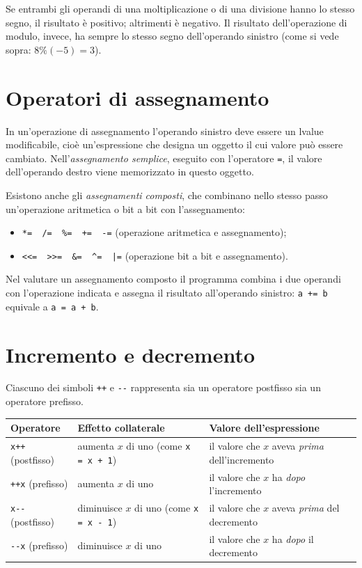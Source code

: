 \documentclass[11pt,a4paper]{article}
\begin{document}
\begin{osservazione}
Se entrambi gli operandi di una moltiplicazione o di una divisione hanno lo stesso segno, il risultato è positivo; altrimenti è negativo. Il risultato dell'operazione di modulo, invece, ha sempre lo stesso segno dell'operando sinistro (come si vede sopra: $8 \% (-5) = 3$).
\end{osservazione}

\section{Operatori di assegnamento}

In un'operazione di assegnamento l'operando sinistro deve essere un lvalue modificabile, cioè un'espressione che designa un oggetto il cui valore può essere cambiato. Nell'\emph{assegnamento semplice}, eseguito con l'operatore \lstinline|=|, il valore dell'operando destro viene memorizzato in questo oggetto.

Esistono anche gli \emph{assegnamenti composti}, che combinano nello stesso passo un'operazione aritmetica o bit a bit con l'assegnamento:
\begin{itemize}
    \item \lstinline|*=  /=  %=  +=  -=| (operazione aritmetica e assegnamento);
    \item \lstinline!<<=  >>=  &=  ^=  |=! (operazione bit a bit e assegnamento).
\end{itemize}
Nel valutare un assegnamento composto il programma combina i due operandi con l'operazione indicata e assegna il risultato all'operando sinistro: \lstinline|a += b| equivale a \lstinline|a = a + b|.

\section{Incremento e decremento}

Ciascuno dei simboli \lstinline|++| e \lstinline|--| rappresenta sia un operatore postfisso sia un operatore prefisso.

\begin{center}
\begin{tabular}{l p{5cm} p{5cm}}
\toprule
Operatore & Effetto collaterale & Valore dell'espressione\\
\midrule
\lstinline|x++| (postfisso) & aumenta $x$ di uno (come \lstinline|x = x + 1|) & il valore che $x$ aveva \emph{prima} dell'incremento\\
\lstinline|++x| (prefisso) & aumenta $x$ di uno & il valore che $x$ ha \emph{dopo} l'incremento\\
\lstinline|x--| (postfisso) & diminuisce $x$ di uno (come \lstinline|x = x - 1|) & il valore che $x$ aveva \emph{prima} del decremento\\
\lstinline|--x| (prefisso) & diminuisce $x$ di uno & il valore che $x$ ha \emph{dopo} il decremento\\
\bottomrule
\end{tabular}
\end{center}
\end{document}
